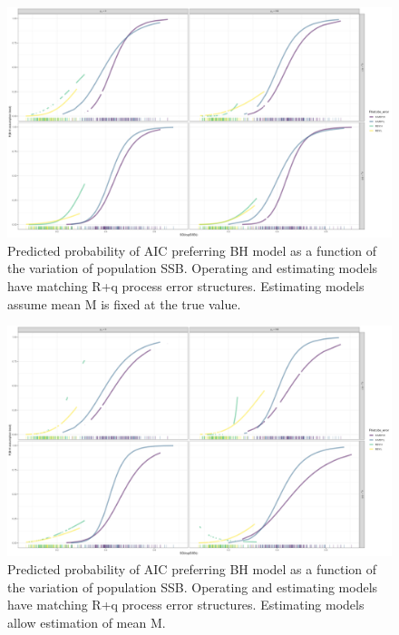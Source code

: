 \documentclass[
  12pt,
]{article}
\begin{document}
\begin{figure}
\caption{Predicted probability of AIC preferring BH model as a function of the variation of population SSB. Operating and estimating models have matching R+q process error structures. Estimating models assume mean M is fixed at the true value.}\label{q_om_MF_BH_glm_AIC_plots}
\begin{center}
\includegraphics[width = \textwidth]{q_om_MF_pred_BH_best.png}
\end{center}
\end{figure}

\begin{figure}
\caption{Predicted probability of AIC preferring BH model as a function of the variation of population SSB. Operating and estimating models have matching R+q process error structures. Estimating models allow estimation of mean M.}\label{q_om_ME_BH_glm_AIC_plots}
\begin{center}
\includegraphics[width = \textwidth]{q_om_ME_pred_BH_best.png}
\end{center}
\end{figure}
\end{document}
